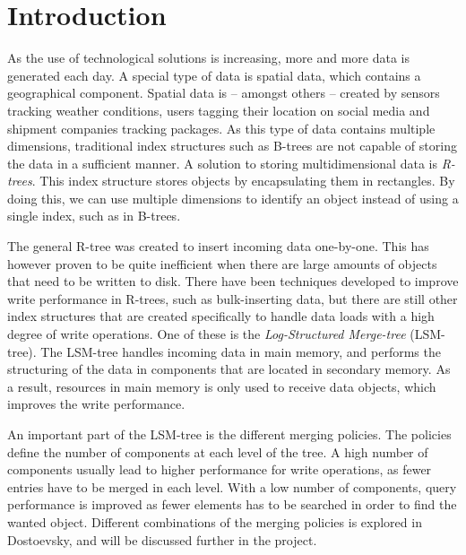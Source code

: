 \chapter{Introduction}
\label{chap:intro}
As the use of technological solutions is increasing, more and more data is generated each day. A special type of data is spatial data, which contains a geographical component. Spatial data is – amongst others – created by sensors tracking weather conditions, users tagging their location on social media and shipment companies tracking packages. As this type of data contains multiple dimensions, traditional index structures such as B-trees are not capable of storing the data in a sufficient manner. A solution to storing multidimensional data is \emph{R-trees}\cite{r-tree}. This index structure stores objects by encapsulating them in rectangles. By doing this, we can use multiple dimensions to identify an object instead of using a single index, such as in B-trees. \newline

\noindent
The general R-tree was created to insert incoming data one-by-one. This has however proven to be quite inefficient when there are large amounts of objects that need to be written to disk. There have been techniques developed to improve write performance in R-trees, such as bulk-inserting data\cite{SeededClustering}\cite{GBI}\cite{STLT}, but there are still other index structures that are created specifically to handle data loads with a high degree of write operations. One of these is the \emph{Log-Structured Merge-tree} (LSM-tree)\cite{LSMTree}. The LSM-tree handles incoming data in main memory, and performs the structuring of the data in components that are located in secondary memory. As a result, resources in main memory is only used to receive data objects, which improves the write performance.\newline

\noindent
An important part of the LSM-tree is the different merging policies. The policies define the number of components at each level of the tree. A high number of components usually lead to higher performance for write operations, as fewer entries have to be merged in each level. With a low number of components, query performance is improved as fewer elements has to be searched in order to find the wanted object. Different combinations of the merging policies is explored in Dostoevsky\cite{Dostoevsky}, and will be discussed further in the project.\newline

